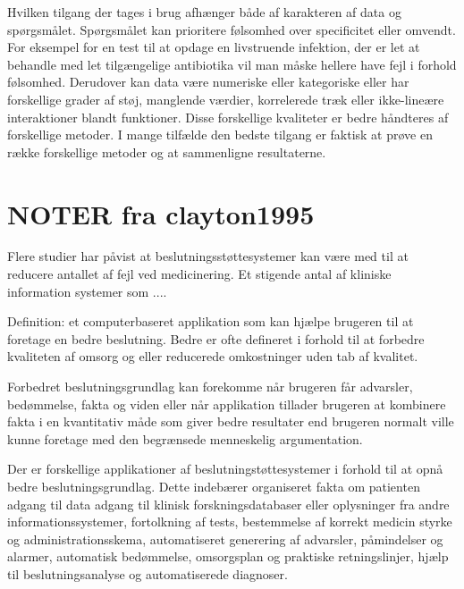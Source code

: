 Hvilken tilgang der tages i brug afhænger både af
karakteren af data og spørgsmålet. Spørgsmålet kan prioritere følsomhed over specificitet eller omvendt. For eksempel for en test til at opdage en livstruende infektion, der er let at behandle med let tilgængelige antibiotika vil man måske hellere have fejl i forhold  følsomhed. Derudover kan data være numeriske eller kategoriske eller har forskellige grader af støj, manglende værdier, korrelerede træk eller ikke-lineære interaktioner blandt funktioner. Disse forskellige kvaliteter er bedre håndteres af forskellige metoder. I mange tilfælde den bedste tilgang er faktisk at prøve en række forskellige metoder og at sammenligne resultaterne.\citep{Masys2006a}


\section{NOTER fra clayton1995}
Flere studier har påvist at beslutningsstøttesystemer kan være med til at reducere antallet af fejl ved medicinering\citep{Evans1998}. Et stigende antal af kliniske information systemer som ....\citep{Clayton1995}

Definition: et computerbaseret applikation som kan hjælpe brugeren til at foretage en bedre beslutning. Bedre er ofte defineret i forhold til at forbedre kvaliteten af omsorg og eller reducerede omkostninger uden tab af kvalitet. \citep{Clayton1995}

Forbedret beslutningsgrundlag kan forekomme når brugeren får advarsler, bedømmelse, fakta og viden eller når applikation tillader brugeren at kombinere fakta i en kvantitativ måde som giver bedre resultater end brugeren normalt ville kunne foretage med den begrænsede menneskelig argumentation.\citep{Clayton1995}

Der er forskellige applikationer af beslutningstøttesystemer i forhold til at opnå bedre beslutningsgrundlag. Dette indebærer organiseret fakta om patienten %
adgang til data %
adgang til klinisk forskningsdatabaser eller oplysninger fra andre informationssystemer, fortolkning af tests, bestemmelse af korrekt medicin styrke og administrationsskema, automatiseret generering af advarsler, påmindelser og alarmer, automatisk bedømmelse, omsorgsplan og praktiske retningslinjer,  hjælp til beslutningsanalyse og automatiserede diagnoser. \citep{Clayton1995}

